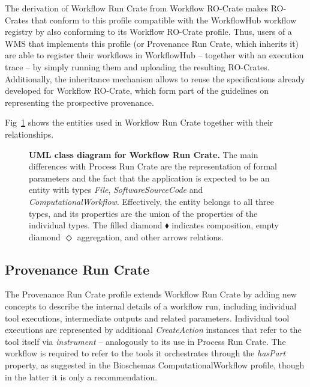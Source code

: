 \documentclass[10pt,letterpaper]{article}
\begin{document}
The derivation of Workflow Run Crate from Workflow RO-Crate makes RO-Crates that conform to this profile compatible with the WorkflowHub workflow registry by also conforming to its Workflow RO-Crate profile.
Thus, users of a WMS that implements this profile (or Provenance Run Crate, which inherits it) are able to register their workflows in WorkflowHub -- together with an execution trace -- by simply running them and uploading the resulting RO-Crates.
Additionally, the inheritance mechanism allows to reuse the specifications already developed for Workflow RO-Crate, which form part of the guidelines on representing the prospective provenance.

Fig~\ref{fig:workflow_crate_er} shows the entities used in Workflow Run Crate together with their relationships.

\begin{figure}[!h]
\caption{{\bf UML class diagram for Workflow Run Crate.}
The main differences with Process Run Crate are the representation of formal parameters and the fact that the application is expected to be an entity with types \emph{File}, \emph{SoftwareSourceCode} and \emph{ComputationalWorkflow}.
Effectively, the entity belongs to all three types, and its properties are the union of the properties of the individual types.
The filled diamond $\blacklozenge$ indicates composition, empty diamond $\Diamond$ aggregation, and other arrows relations.
}
\label{fig:workflow_crate_er}
\end{figure}


\subsection{Provenance Run Crate}\label{provenance-run-crate}

The Provenance Run Crate profile \cite{WRROC 2023c} extends Workflow Run Crate by adding new concepts to describe the internal details of a workflow run, including individual tool executions, intermediate outputs and related parameters.
Individual tool executions are represented by additional \emph{CreateAction} instances that refer to the tool itself via \emph{instrument} -- analogously to its use in Process Run Crate.
The workflow is required to refer to the tools it orchestrates through the \emph{hasPart} property, as suggested in the Bioschemas ComputationalWorkflow profile, though in the latter it is only a recommendation.
\end{document}

